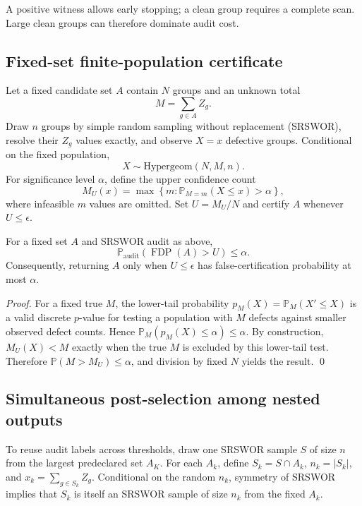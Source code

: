 \documentclass[runningheads]{llncs}
\newcommand{\FDP}{\operatorname{FDP}}
\newcommand{\Prb}{\mathbb{P}}
\begin{document}
A positive witness allows early stopping; a clean group requires a complete scan. Large clean groups can therefore dominate audit cost.

\subsection{Fixed-set finite-population certificate}
Let a fixed candidate set $A$ contain $N$ groups and an unknown total
\begin{equation}
M=\sum_{g\in A}Z_g.
\end{equation}
Draw $n$ groups by simple random sampling without replacement (SRSWOR), resolve their $Z_g$ values exactly, and observe $X=x$ defective groups. Conditional on the fixed population,
\begin{equation}
X\sim\mathrm{Hypergeom}(N,M,n).
\end{equation}
For significance level $\alpha$, define the upper confidence count
\begin{equation}
M_U(x)=\max\left\{m:\Prb_{M=m}(X\le x)>\alpha\right\},
\label{eq:hyperupper}
\end{equation}
where infeasible $m$ values are omitted. Set $U=M_U/N$ and certify $A$ whenever $U\le\epsilon$.

\begin{theorem}
For a fixed set $A$ and SRSWOR audit as above,
\begin{equation}
\Prb_{\mathrm{audit}}\!\left(\FDP(A)>U\right)\le\alpha.
\end{equation}
Consequently, returning $A$ only when $U\le\epsilon$ has false-certification probability at most $\alpha$.
\end{theorem}
\begin{proof}
For a fixed true $M$, the lower-tail probability $p_M(X)=\Prb_M(X'\le X)$ is a valid discrete $p$-value for testing a population with $M$ defects against smaller observed defect counts. Hence $\Prb_M(p_M(X)\le\alpha)\le\alpha$. By construction, $M_U(X)<M$ exactly when the true $M$ is excluded by this lower-tail test. Therefore $\Prb(M>M_U)\le\alpha$, and division by fixed $N$ yields the result. \qed
\end{proof}

\subsection{Simultaneous post-selection among nested outputs}
To reuse audit labels across thresholds, draw one SRSWOR sample $S$ of size $n$ from the largest predeclared set $A_K$. For each $A_k$, define $S_k=S\cap A_k$, $n_k=|S_k|$, and $x_k=\sum_{g\in S_k}Z_g$. Conditional on the random $n_k$, symmetry of SRSWOR implies that $S_k$ is itself an SRSWOR sample of size $n_k$ from the fixed $A_k$.
\end{document}
